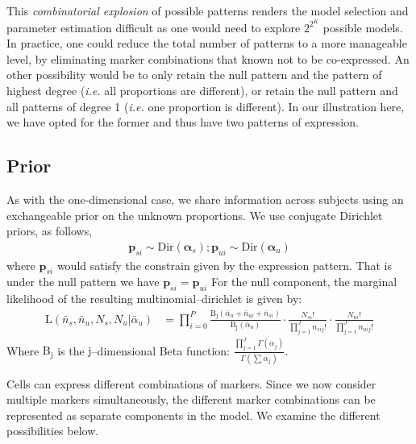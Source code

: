\documentclass[11pt]{article}
\begin{document}
This \textit{combinatorial explosion} of possible patterns renders the model selection and parameter estimation difficult as one would need to explore $2^{2^K}$ possible models. 
In practice, one could reduce the total number of patterns to a more manageable level, by eliminating marker combinations that known not to be co-expressed. An other possibility would be to only retain the null pattern
and the pattern of highest degree (\textit{i.e.} all proportions are different), or retain the null pattern and all patterns of degree 1 (\textit{i.e.} one proportion is different). In our illustration here, we have opted for the former and thus have two patterns of expression. 

\subsection{Prior}
As with the one-dimensional case, we share information across subjects using an exchangeable prior on the unknown proportions. We use conjugate Dirichlet priors, as follows,
\begin{align}
\mathbf{p}_{si} \sim \mathrm{Dir}(\mathbf{\alpha}_s) ; \mathbf{p}_{ui} \sim \mathrm{Dir}(\mathbf{\alpha}_u)
\end{align}
where $\mathbf{p}_{si}$ would satisfy the constrain given by the expression pattern. That is under the null pattern we have $\mathbf{p}_{si}=\mathbf{p}_{ui}$
For the null component, the marginal likelihood of the resulting multinomial--dirichlet is given by: 
\begin{align}
\mathrm{L}(\bar{n}_s,\bar{n}_u,N_s,N_u|\bar{\alpha}_u) &= \prod_{i=0}^P\frac{ \mathrm{B_j}(\bar{\alpha}_{u}+\bar{n}_{ui}+\bar{n}_{si})}{\mathrm{B_j}(\bar{\alpha}_u)} \cdot \frac{N_{si}!}{\prod_{j=1}^J n_{sij}!} \cdot \frac{N_{ui}!}{\prod_{j=1}^J n_{uij}!}\label{NRmd}
\end{align}
Where $\mathrm{B_j}$ is the $\mathrm{j}$--dimensional Beta function: $\frac{\prod_{j=1}^J\Gamma(\alpha_j)}{\Gamma(\sum\alpha_j)}$.

Cells can express different combinations of markers. Since we now consider multiple markers simultaneously, the different marker combinations can be represented as separate components in the model. We examine the different possibilities below.
\end{document}
